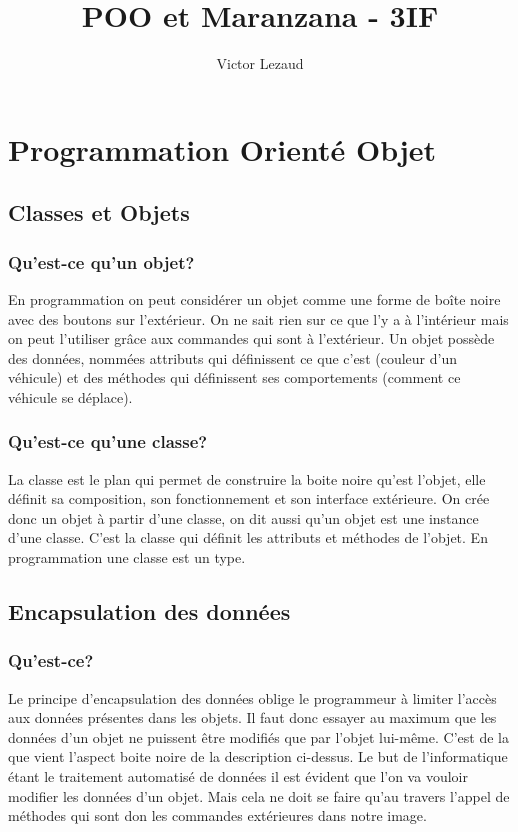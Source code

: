 \documentclass[10pt,a4paper,twoside]{article}
\author{Victor Lezaud}
\title{POO et Maranzana - 3IF}
\begin{document}
\maketitle
\renewcommand{\contentsname}{Sommaire}
\tableofcontents

\newpage
\section{Programmation Orienté Objet}
\subsection{Classes et Objets}
\subsubsection{Qu'est-ce qu'un objet?}
En programmation on peut considérer un objet comme une forme de boîte noire avec des boutons sur l'extérieur. On ne sait rien sur ce que l'y a à l'intérieur mais on peut l'utiliser grâce aux commandes qui sont à l'extérieur. Un objet possède des données, nommées attributs qui définissent ce que c'est (couleur d'un véhicule) et des méthodes qui définissent ses comportements (comment ce véhicule se déplace).

\subsubsection{Qu'est-ce qu'une classe?}
La classe est le plan qui permet de construire la boite noire qu'est l'objet, elle définit sa composition, son fonctionnement et son interface extérieure. On crée donc un objet à partir d'une classe, on dit aussi qu'un objet est une instance d'une classe. C'est la classe qui définit les attributs et méthodes de l'objet. En programmation une classe est un type.

\subsection{Encapsulation des données}
\subsubsection{Qu'est-ce?}
Le principe d'encapsulation des données oblige le programmeur à limiter l'accès aux données présentes dans les objets. Il faut donc essayer au maximum que les données d'un objet ne puissent être modifiés que par l'objet lui-même. C'est de la que vient l'aspect boite noire de la description ci-dessus. Le but de l'informatique étant le traitement automatisé de données il est évident que l'on va vouloir modifier les données d'un objet. Mais cela ne doit se faire qu'au travers l'appel de méthodes qui sont don les commandes extérieures dans notre image. 
\end{document}
